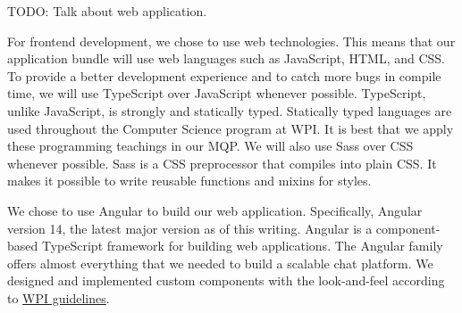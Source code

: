 TODO: Talk about web application.


    For frontend development, we chose to use web technologies.
    This means that our application bundle will use web languages such as JavaScript, HTML, and CSS.
    To provide a better development experience and to catch more bugs in compile time, we will use TypeScript over JavaScript whenever possible.
    TypeScript, unlike JavaScript, is strongly and statically typed.
    Statically typed languages are used throughout the Computer Science program at WPI.
    It is best that we apply these programming teachings in our MQP.
    We will also use Sass over CSS whenever possible.
    Sass is a CSS preprocessor that compiles into plain CSS.
    It makes it possible to write reusable functions and mixins for styles.


    We chose to use Angular to build our web application.
    Specifically, Angular version 14, the latest major version as of this writing.
    Angular is a component-based TypeScript framework for building web applications.
    The Angular family offers almost everything that we needed to build a scalable chat platform.
    We designed and implemented custom components with the look-and-feel according to \hyperref[ch:methodology:sec:conceptual_designs:subsec:wpi_guidelines]{WPI guidelines}.
